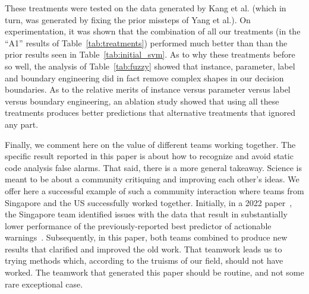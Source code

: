  These treatments were tested on the data generated by Kang et al.
 (which in turn, was generated by fixing the prior missteps of Yang et al.).
 On experimentation, it was shown that the combination of
 all our treatments (in the ``A1'' results of 
  Table~\ref{tab:treatments}) performed much better than than the prior
  results seen in  Table~\ref{tab:initial_svm}. 
 As to why these treatments before so well, the analysis
 of Table~\ref{tab:fuzzy} showed that instance, parameter, label and boundary engineering
 did in fact remove complex shapes in our decision boundaries.
  As to the relative merits of instance versus parameter versus label versus boundary engineering,
an ablation study showed that using all these treatments produces better predictions that 
   alternative treatments that ignored any part.
   
   
  
  

Finally, we comment here on the value of different teams working together.
The specific result reported in this paper
is about 
how to recognize and avoid
static code analysis false alarms. That said,
there is a more general takeaway.
Science is meant to be about a community critiquing and improving each other's ideas. We offer here a successful example of such a community interaction where teams from Singapore and the US successfully worked together. Initially, in a 2022 paper~\cite{kang2022detecting}, the Singapore team identified issues with the data that result in substantially lower performance of the previously-reported best predictor of actionable warnings~\cite{wang2018there, yang2021learning,yang2021understanding}. Subsequently, in this paper,
both teams combined  to produce new results that clarified and improved the old work.
That teamwork leads us to trying    methods which, according to the truisms of our field, should not have worked.   The teamwork that generated this paper
  should be routine, and not some rare exceptional case.
   
  


 
 
 
 
 